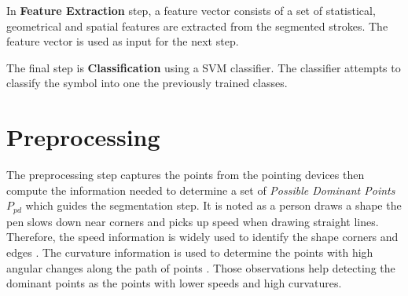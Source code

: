  In \textbf{Feature Extraction} step, a feature vector consists of a set of statistical, geometrical and spatial features are extracted from the segmented strokes. The feature vector is used as input for the next step.   %
  
   The final step is \textbf{Classification} using a SVM classifier. The classifier attempts to classify the symbol into one the previously trained classes.%
 



\section{Preprocessing}
\label{sec:Preprocessing}
The preprocessing step captures the points from the pointing devices then compute the information needed to determine a set of  \textit{Possible Dominant Points $P_{pd}$} which guides the segmentation step. It is noted as a person draws a shape the pen slows down near corners and picks up speed when drawing straight lines. Therefore, the speed information is widely used to identify the shape corners and edges \cite{earlyprocess}. The curvature information is used to determine the points with high angular changes along the path of points \cite{meanshift10}. Those observations help detecting the dominant points as the points with lower speeds and high curvatures. 

